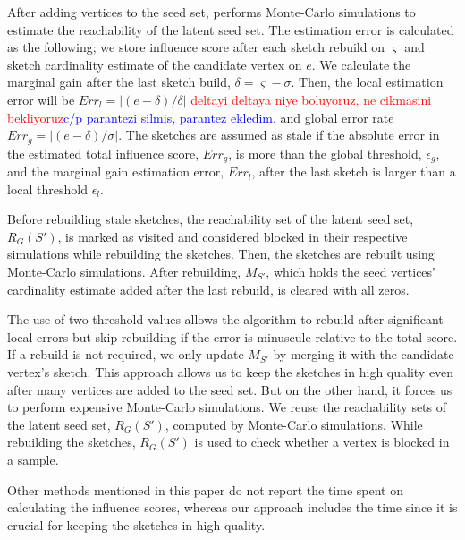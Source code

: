 \documentclass[10pt,journal,compsoc]{IEEEtran}
\newcommand\ggx[1]{\textcolor{blue}{#1}}
\newcommand\acro{{\sc{HyperFuseR\xspace}\xspace}\xspace}
\newcommand\kktodo[1]{\textcolor{red}{#1}}
\begin{document}
After adding vertices to the seed set, \acro performs Monte-Carlo simulations to estimate the reachability of the latent seed set.
The estimation error is calculated as the following; we store influence score after each sketch rebuild on $\varsigma$ and sketch cardinality estimate of the candidate vertex on $e$. We calculate the marginal gain after the last sketch build, $\delta=\varsigma - \sigma$. Then, the local estimation error will be $Err_l=|(e-\delta) / \delta|$ \kktodo{deltayi deltaya niye boluyoruz, ne cikmasini bekliyoruz}\ggx{c/p parantezi silmis, parantez ekledim.} and global error rate $Err_g=|(e-\delta) / \sigma|$. 
The sketches are assumed as stale if the absolute error in the estimated total influence score, $Err_g$, is more than the global threshold, $\epsilon_{g}$, 
and the marginal gain estimation error, $Err_l$, after the last sketch is larger than a local threshold $\epsilon_{l}$.

Before rebuilding stale sketches, the reachability set of the latent seed set, $R_G(S')$, is marked as visited and considered blocked in their respective simulations while rebuilding the sketches. Then, the sketches are rebuilt using Monte-Carlo simulations. After rebuilding, $M_{S'}$, which holds the seed vertices' cardinality estimate added after the last rebuild, is cleared with all zeros.

The use of two threshold values allows the algorithm to rebuild after significant local errors but skip rebuilding if the error is minuscule relative to the total score. 
If a rebuild is not required, we only update $M_{S'}$ by merging it with the candidate vertex's sketch. 
This approach allows us to keep the sketches in high quality even after many vertices are added to the seed set. But on the other hand, it forces us to perform expensive Monte-Carlo simulations. 
We reuse the reachability sets of the latent seed set, $R_G(S')$, computed by Monte-Carlo simulations. While rebuilding the sketches, $R_G(S')$ is used to check whether a vertex is blocked in a sample.

Other methods mentioned in this paper do not report the time spent on calculating the influence scores, 
whereas our approach includes the time since it is crucial for keeping the sketches in high quality.
\end{document}
